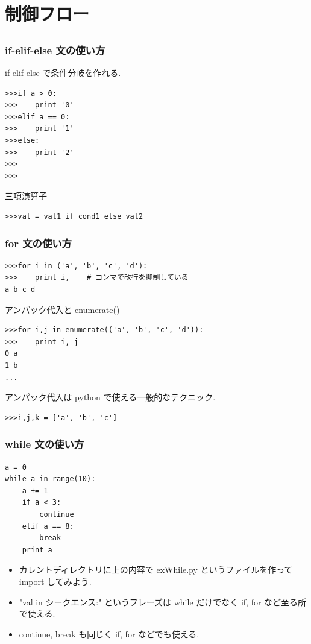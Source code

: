\subsection*{\redm\whitem\greenb}

\section{制御フロー}
\subsection*{\redm\whitem\greenb}

\begin{frame}[t,fragile]
\frametitle{if-elif-else 文の使い方}
if-elif-else で条件分岐を作れる. 
\begin{lstlisting}[stepnumber=1]
>>>if a > 0:
>>>    print '0'
>>>elif a == 0:
>>>    print '1'
>>>else:
>>>    print '2'
>>>
>>>
\end{lstlisting}

三項演算子

\begin{lstlisting}
>>>val = val1 if cond1 else val2
\end{lstlisting}

\end{frame}

\begin{frame}[t,fragile]
\frametitle{for 文の使い方}
\begin{lstlisting}
>>>for i in ('a', 'b', 'c', 'd'):
>>>    print i,    # コンマで改行を抑制している
a b c d
\end{lstlisting}

アンパック代入と enumerate()
\begin{lstlisting}
>>>for i,j in enumerate(('a', 'b', 'c', 'd')):
>>>    print i, j
0 a
1 b
...
\end{lstlisting}
アンパック代入は python で使える一般的なテクニック. 
\begin{lstlisting}
>>>i,j,k = ['a', 'b', 'c']
\end{lstlisting}
\end{frame}

\begin{frame}[t,fragile]
\frametitle{while 文の使い方}
\begin{lstlisting}
a = 0
while a in range(10):
    a += 1
    if a < 3:
        continue
    elif a == 8:
        break
    print a

\end{lstlisting}

\begin{itemize}
\item カレントディレクトリに上の内容で exWhile.py というファイルを作って import してみよう.
\item "val in シークエンス:" というフレーズは while だけでなく if, for など至る所で使える.
\item continue, break も同じく if, for などでも使える.
\end{itemize}

\end{frame}

